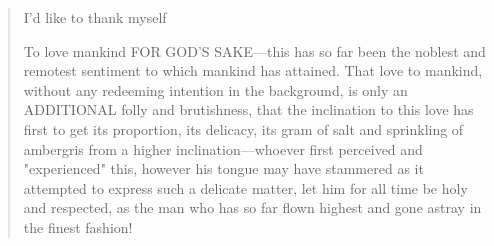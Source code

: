 \newpage
\newenvironment{remerciment}
     {\vspace{6ex}\begin{quotation}\begin{center}\begin{em}}
     {\par\end{em}\end{center}\end{quotation}}

     \begin{remerciment}
\par I'd like to thank myself \\
\par To love mankind FOR GOD'S SAKE—this has so far been the noblest and remotest sentiment to which mankind has attained. That love to mankind, without any redeeming intention in the background, is only an ADDITIONAL folly and brutishness, that the inclination to this love has first to get its proportion, its delicacy, its gram of salt and sprinkling of ambergris from a higher inclination—whoever first perceived and "experienced" this, however his tongue may have stammered as it attempted to express such a delicate matter, let him for all time be holy and respected, as the man who has so far flown highest and gone astray in the finest fashion!
     \end{remerciment}